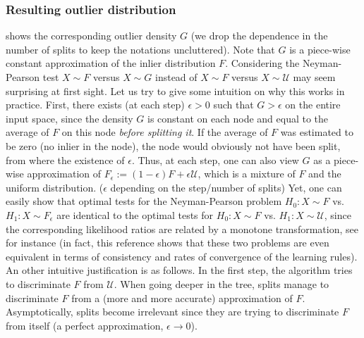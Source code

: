 \subsubsection{Resulting outlier distribution}
 shows the corresponding outlier density $G$ (we
drop the dependence in the number of splits to keep the notations uncluttered).
Note that $G$ is a piece-wise constant approximation of the inlier distribution
$F$. Considering the Neyman-Pearson test $X \sim F$ versus $X \sim G$ instead
of $X \sim F$ versus $X \sim \mathcal{U}$ may seem surprising at first sight.
Let us try to give some intuition on why this works in practice. First, there
exists (at each step) $\epsilon>0$ such that $G>\epsilon$ on the entire input
space, since the density $G$ is constant on each node and equal to the average
of $F$ on this node \emph{before splitting it}. If the average of $F$ was
estimated to be zero (no inlier in the node), the node would obviously not have
been split, from where the existence of $\epsilon$.
%
Thus, at each step, one can also view $G$ as
a piece-wise approximation of $F_\epsilon := (1 - \epsilon) F + \epsilon
\mathcal{U}$, which is a mixture of $F$ and the uniform distribution. %
($\epsilon$ depending on the step/number of splits) Yet, one can easily show
that optimal tests for the Neyman-Pearson problem $H_0: X \sim F$ vs. $H_1: X
\sim F_\epsilon$ are identical to the optimal tests for $H_0: X \sim F$ vs.
$H_1: X \sim \mathcal{U}$, since the corresponding likelihood ratios are
related by a monotone transformation, see \citet{Scott2009} for instance (in
fact, this reference shows that these two problems are even equivalent in terms
of consistency and rates of convergence of the learning rules). An other
intuitive justification is as follows. In the first step, the algorithm tries
to discriminate $F$ from $\mathcal{U}$. When going deeper in the tree, splits
manage to discriminate $F$ from a (more and more accurate) approximation of
$F$. Asymptotically, splits become irrelevant since they are trying to
discriminate $F$ from itself (a perfect approximation, $\epsilon \to 0$).
%

